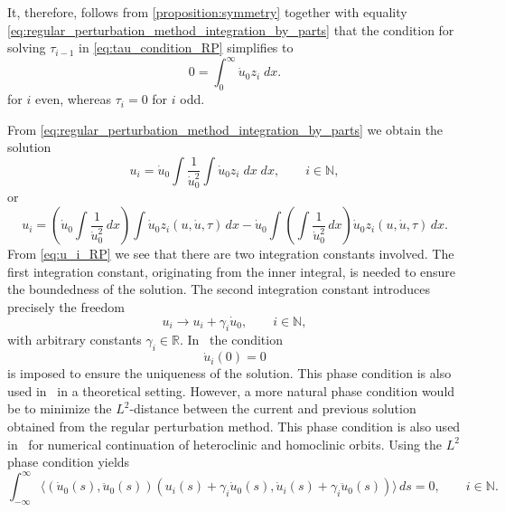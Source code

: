 It, therefore, follows from \cref{proposition:symmetry} together with equality
\cref{eq:regular_perturbation_method_integration_by_parts} that the condition for
solving $\tau_{i-1}$ in \cref{eq:tau_condition_RP} simplifies to
\begin{equation}
    \label{eq:tau_condition_RP}
    0 = \int_0^\infty \dot u_0 z_i \; dx.
\end{equation}
for $i$ even, whereas $\tau_i=0$ for $i$ odd.

From \cref{eq:regular_perturbation_method_integration_by_parts} we obtain the
solution
\begin{equation}
    \label{eq:u_i_RP}
    u_i = \dot u_0 \int \frac{1}{\dot u_0^2} \int \dot u_0 z_i \; dx \; dx,
        \qquad i \in \mathbb N,
\end{equation}
or
\begin{equation*}
    u_i = \left( \dot u_0 \int \frac{1}{\dot u_0^2} \, dx \right) \int \dot u_0 z_i(u,\dot u,\tau) \, dx
-  \dot u_0 \int \left( \int \frac{1}{\dot u_0^2} \, dx \right) \dot u_0 z_i(u,\dot u,\tau) \, dx. 
\end{equation*}
From \cref{eq:u_i_RP} we see that there are two integration constants involved.
The first integration constant, originating from the inner integral, is needed
to ensure the boundedness of the solution. The second integration constant
introduces precisely the freedom 
\begin{equation*}
    u_i \rightarrow u_i + \gamma_i \dot u_0,  \qquad i\in\mathbb N,
\end{equation*}
with arbitrary constants $\gamma_i\in\mathbb{R}$. In~\cite{Kuznetsov2014improved} the
condition
\begin{equation}
    \label{eq:RP_phase_condtion_unnatural}
    \dot u_i(0) = 0
\end{equation}
is imposed to ensure the uniqueness of the solution.  This phase condition is also
used in~\cite{Beyn_1994} in a theoretical setting. However, a more natural phase
condition would be to minimize the $L^2$-distance between the current and
previous solution obtained from the regular perturbation method. This
phase condition is also used in~\cite{Doedel1986auto, Champneys1996,
DeWitte2012,Doedel@1989} for numerical continuation of heteroclinic and
homoclinic orbits. Using the $L^2$ phase condition yields
\begin{equation*}
  \int_{-\infty}^\infty 
        \langle 
            (\dot u_0(s), \ddot u_0(s)) (u_{i}(s) + \gamma_i \dot u_0(s),
            \dot u_{i}(s) + \gamma_i \ddot u_0(s)) 
        \rangle
        \, ds = 0,
    \qquad i \in \mathbb{N}.
\end{equation*}
